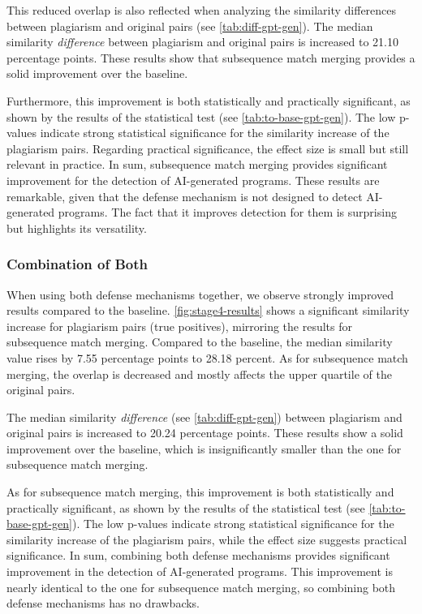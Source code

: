 This reduced overlap is also reflected when analyzing the similarity differences between plagiarism and original pairs (see \autoref{tab:diff-gpt-gen}).
The median similarity \textit{difference} between plagiarism and original pairs is increased to 21.10 percentage points.
These results show that subsequence match merging provides a solid improvement over the baseline.

Furthermore, this improvement is both statistically and practically significant, as shown by the results of the statistical test (see \autoref{tab:to-base-gpt-gen}).
The low p-values indicate strong statistical significance for the similarity increase of the plagiarism pairs.
Regarding practical significance, the effect size is small but still relevant in practice.
In sum, subsequence match merging provides significant improvement for the detection of AI-generated programs.
These results are remarkable, given that the defense mechanism is not designed to detect AI-generated programs. The fact that it improves detection for them is surprising but highlights its versatility.

\subsubsection{Combination of Both}
When using both defense mechanisms together, we observe strongly improved results compared to the baseline.
\autoref{fig:stage4-results} shows a significant similarity increase for plagiarism pairs (true positives), mirroring the results for subsequence match merging.
Compared to the baseline, the median similarity value rises by 7.55 percentage points to 28.18 percent.
As for subsequence match merging, the overlap is decreased and mostly affects the upper quartile of the original pairs.

The median similarity \textit{difference} (see \autoref{tab:diff-gpt-gen}) between plagiarism and original pairs is increased to 20.24 percentage points.
These results show a solid improvement over the baseline, which is insignificantly smaller than the one for subsequence match merging. 

As for subsequence match merging, this improvement is both statistically and practically significant, as shown by the results of the statistical test (see \autoref{tab:to-base-gpt-gen}).
The low p-values indicate strong statistical significance for the similarity increase of the plagiarism pairs, while the effect size suggests practical significance.
In sum, combining both defense mechanisms provides significant improvement in the detection of AI-generated programs.
This improvement is nearly identical to the one for subsequence match merging, so combining both defense mechanisms has no drawbacks.

